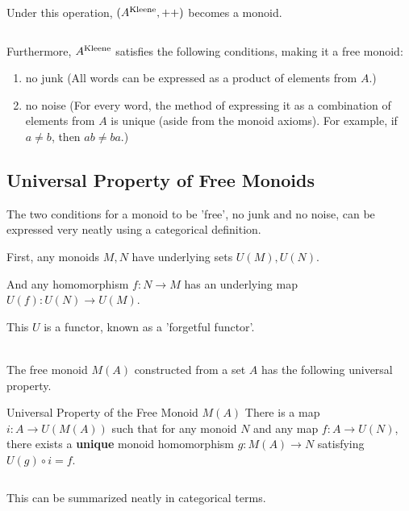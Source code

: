 \documentclass[uplatex,a4j,12pt,dvipdfmx]{jsarticle}
\begin{document}
Under this operation, $(A^{\rm Kleene}, ++)$ becomes a monoid.

${}$

Furthermore, $A^{\rm Kleene}$ satisfies the following conditions, making it a free monoid:
\begin{enumerate}
	\item no junk (All words can be expressed as a product of elements from $A$.)
	\item no noise (For every word, the method of expressing it as a combination of elements from $A$ is unique (aside from the monoid axioms). For example, if $a\neq b$, then $ab \neq ba$.)
\end{enumerate}

\subsection{Universal Property of Free Monoids}

The two conditions for a monoid to be 'free', no junk and no noise, can be expressed very neatly using a categorical definition.

First, any monoids $M, N$ have underlying sets $U(M), U(N)$.

And any homomorphism $f: N \to M$ has an underlying map $U(f) : U(N) \to U(M)$.

This $U$ is a functor, known as a 'forgetful functor'.

\ \\

The free monoid $M(A)$ constructed from a set $A$ has the following universal property.

\begin{itembox}[l]{Universal Property of the Free Monoid $M(A)$}
	There is a map $i: A \to U(M(A))$ such that for any monoid $N$ and any map $f: A \to U(N)$,
	there exists a \textbf{unique} monoid homomorphism $g: M(A) \to N$ satisfying $U(g) \circ i = f$.
\end{itembox}

${}$

This can be summarized neatly in categorical terms.

${}$
\end{document}
